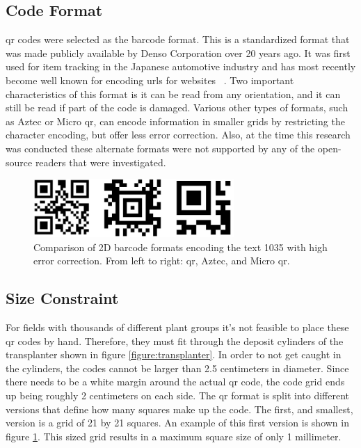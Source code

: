 \subsection{Code Format}
\label{section:code_format}

\acf{qr} codes were selected as the barcode format. This is a standardized format that was made publicly available by Denso Corporation over 20 years ago.  It was first used for item tracking in the Japanese automotive industry and has most recently become well known for encoding \acp{url} for websites ~\citep{Denso:2014}. Two important characteristics of this format is it can be read from any orientation, and it can still be read if part of the code is damaged.  Various other types of formats, such as Aztec or Micro \ac{qr}, can encode information in smaller grids by restricting the character encoding, but offer less error correction.  Also, at the time this research was conducted these alternate formats were not supported by any of the open-source readers that were investigated. 

\begin{figure}
	\centering
    \includegraphics[width=3in]{figures/generated_codes_1035.jpg}
    \caption[2D barcode formats]{Comparison of 2D barcode formats encoding the text 1035 with high error correction.  From left to right: \acf{qr}, Aztec, and Micro \ac{qr}.}
    \label{barcode_formats}
\end{figure} 

\subsection{Size Constraint}

For fields with thousands of different plant groups it's not feasible to place these \ac{qr} codes by hand.  Therefore, they must fit through the deposit cylinders of the transplanter shown in figure \ref{figure:transplanter}.  In order to not get caught in the cylinders, the codes cannot be larger than 2.5 centimeters in diameter. Since there needs to be a white margin around the actual \ac{qr} code, the code grid ends up being roughly 2 centimeters on each side.  The \ac{qr} format is split into different versions that define how many squares make up the code.  The first, and smallest, version is a grid of 21 by 21 squares.  An example of this first version is shown in figure \ref{barcode_formats}.  This sized grid results in a maximum square size of only 1 millimeter.  

